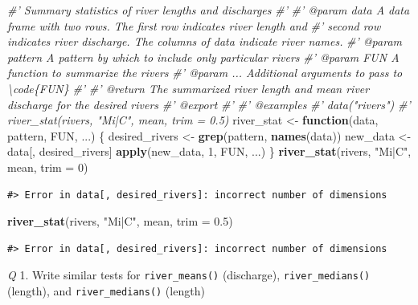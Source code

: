 \documentclass[
]{book}
\newenvironment{Shaded}{\begin{snugshade}}{\end{snugshade}}
\newcommand{\CommentTok}[1]{\textcolor[rgb]{0.56,0.35,0.01}{\textit{#1}}}
\newcommand{\ControlFlowTok}[1]{\textcolor[rgb]{0.13,0.29,0.53}{\textbf{#1}}}
\newcommand{\DataTypeTok}[1]{\textcolor[rgb]{0.13,0.29,0.53}{#1}}
\newcommand{\DecValTok}[1]{\textcolor[rgb]{0.00,0.00,0.81}{#1}}
\newcommand{\FloatTok}[1]{\textcolor[rgb]{0.00,0.00,0.81}{#1}}
\newcommand{\KeywordTok}[1]{\textcolor[rgb]{0.13,0.29,0.53}{\textbf{#1}}}
\newcommand{\NormalTok}[1]{#1}
\newcommand{\StringTok}[1]{\textcolor[rgb]{0.31,0.60,0.02}{#1}}
\begin{document}
\begin{Shaded}
\begin{Highlighting}[]
\CommentTok{#' Summary statistics of river lengths and discharges}
\CommentTok{#'}
\CommentTok{#' @param data A data frame with two rows. The first row indicates river length and}
\CommentTok{#'   second row indicates river discharge. The columns of data indicate river names.}
\CommentTok{#' @param pattern A pattern by which to include only particular rivers}
\CommentTok{#' @param FUN A function to summarize the rivers}
\CommentTok{#' @param ... Additional arguments to pass to \textbackslash{}code\{FUN\}}
\CommentTok{#'}
\CommentTok{#' @return The summarized river length and mean river discharge for the desired rivers}
\CommentTok{#' @export}
\CommentTok{#'}
\CommentTok{#' @examples}
\CommentTok{#' data("rivers")}
\CommentTok{#' river_stat(rivers, "Mi|C", mean, trim = 0.5)}
\NormalTok{river_stat <-}\StringTok{ }\ControlFlowTok{function}\NormalTok{(data, pattern, FUN, ...) \{}
\NormalTok{  desired_rivers <-}\StringTok{ }\KeywordTok{grep}\NormalTok{(pattern, }\KeywordTok{names}\NormalTok{(data))}
\NormalTok{  new_data <-}\StringTok{ }\NormalTok{data[, desired_rivers]}
  \KeywordTok{apply}\NormalTok{(new_data, }\DecValTok{1}\NormalTok{, FUN, ...)}
\NormalTok{\}}
\KeywordTok{river_stat}\NormalTok{(rivers, }\StringTok{"Mi|C"}\NormalTok{, mean, }\DataTypeTok{trim =} \DecValTok{0}\NormalTok{)}
\end{Highlighting}
\end{Shaded}

\begin{verbatim}
#> Error in data[, desired_rivers]: incorrect number of dimensions
\end{verbatim}

\begin{Shaded}
\begin{Highlighting}[]
\KeywordTok{river_stat}\NormalTok{(rivers, }\StringTok{"Mi|C"}\NormalTok{, mean, }\DataTypeTok{trim =} \FloatTok{0.5}\NormalTok{)}
\end{Highlighting}
\end{Shaded}

\begin{verbatim}
#> Error in data[, desired_rivers]: incorrect number of dimensions
\end{verbatim}

\emph{Q} 1. Write similar tests for \texttt{river\_means()} (discharge), \texttt{river\_medians()} (length), and \texttt{river\_medians()} (length)
\end{document}

